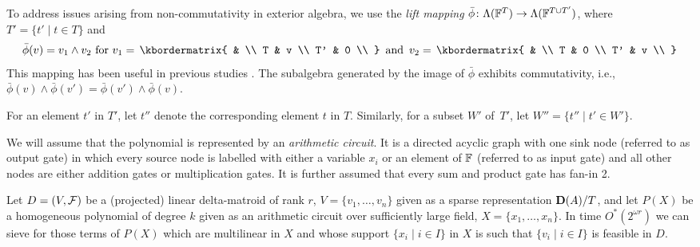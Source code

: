 To address issues arising from non-commutativity in exterior algebra, we use the \emph{lift mapping} $\bar{\phi} \colon \Lambda(\mathbb F^T) \to \Lambda(\mathbb F^{T \cup T'})$, where $T' = \{ t' \mid t \in T \}$ and 
\vspace{-3ex}
\begin{align*}
  \bar{\phi}(v) = v_1 \wedge v_2 \text{ for } v_1 =\,
  \kbordermatrix{
    & \\
    T & v \\ 
    T' & 0 \\
  } \, \text{ and } \,
  v_2 =\, \kbordermatrix{
    & \\
    T & 0 \\ 
    T' & v \\
  }
\end{align*}
This mapping has been useful in previous studies \cite{Brand19,BrandDH18,EKW23}.
The subalgebra generated by the image of $\bar{\phi}$ exhibits commutativity, i.e., $\bar{\phi}(v) \wedge \bar{\phi}(v') =  \bar{\phi}(v') \wedge \bar{\phi}(v)$.

For an element $t'$ in $T'$, let $t''$ denote the corresponding element $t$ in $T$. Similarly, for a subset $W'$ of~$T'$, let $W'' = \{ t'' \mid t' \in W' \}$.

We will assume that the polynomial is represented by an \emph{arithmetic circuit}.
It is a directed acyclic graph with one sink node (referred to as output gate) in which every source node is labelled with either a variable $x_i$ or an element of $\mathbb F$ (referred to as input gate) and all other nodes are either addition gates or multiplication gates.
It is further assumed that every sum and product gate has fan-in 2.

\begin{theorem} \label{theorem:sieving-general}
  Let $D=(V,\mathcal F)$ be a (projected) linear delta-matroid of rank $r$, $V=\{v_1,\ldots,v_n\}$ given as a sparse representation $\mathbf D(A) / T$,
  and let $P(X)$ be a homogeneous polynomial of degree $k$ given as an arithmetic circuit over
  sufficiently large field, $X=\{x_1,\ldots,x_n\}$.
  In time $O^*(2^{\omega r})$ we can sieve for those terms of $P(X)$ which
  are multilinear in $X$ and whose support $\{x_i \mid i \in I\}$
  in $X$ is such that $\{v_i \mid i \in I\}$ is feasible in $D$. 
\end{theorem}


